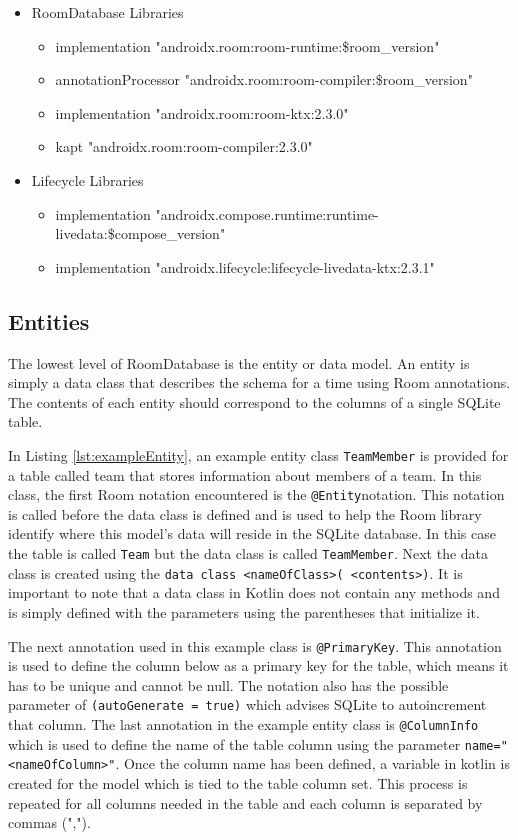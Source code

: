 \documentclass[12pt]{article}
\begin{document}
\begin{itemize}
\item RoomDatabase Libraries \begin{itemize}
    \item implementation "androidx.room:room-runtime:\$room\_version"
    \item annotationProcessor "androidx.room:room-compiler:\$room\_version"
    \item implementation "androidx.room:room-ktx:2.3.0"
    \item kapt "androidx.room:room-compiler:2.3.0"
    \end{itemize}
 \item Lifecycle Libraries \begin{itemize}
    \item implementation "androidx.compose.runtime:runtime-livedata:\$compose\_version"
    \item implementation "androidx.lifecycle:lifecycle-livedata-ktx:2.3.1"
    \end{itemize}
\end{itemize}
 \newpage
 
 \subsection{Entities}
The lowest level of RoomDatabase is the entity or data model. An entity is simply a data class that describes the schema for a time using Room annotations. The contents of each entity should correspond to the columns of a single SQLite table. 


In Listing \ref{lst:exampleEntity}, an example entity class \verb|TeamMember| is provided for a table called team that stores information about members of a team. In this class, the first Room notation encountered is the \verb|@Entity|notation. This notation is called before the data class is defined and is used to help the Room library identify where this model's data will reside in the SQLite database. In this case the table is called \verb|Team| but the data class is called \verb|TeamMember|. 
Next the data class is created using the \verb|data class <nameOfClass>( <contents>)|. It is important to note that a data class in Kotlin does not contain any methods and is simply defined with the parameters using the parentheses that initialize it. 

The next annotation used in this example class is \verb|@PrimaryKey|. This annotation is used to define the column below as a primary key for the table, which means it has to be unique and cannot be null. The notation also has the possible parameter of \verb|(autoGenerate = true)| which advises SQLite to autoincrement that column. 
The last annotation in the example entity class is \verb|@ColumnInfo| which is used to define the name of the table column using the parameter \verb|name="<nameOfColumn>"|. Once the column name has been defined, a variable in kotlin is created for the model which is tied to the table column set. This process is repeated for all columns needed in the table and each column is separated by commas (","). 
 
\end{document}
